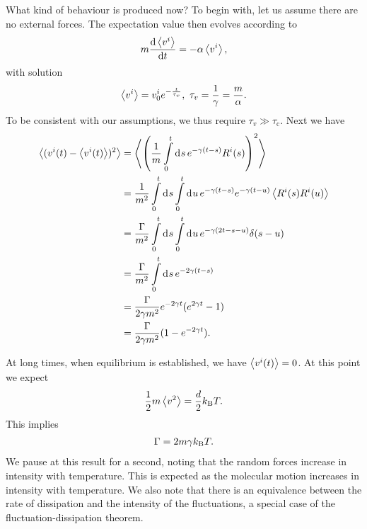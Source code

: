 What kind of behaviour is produced now? To begin with, let us assume there are no external forces. The expectation value then evolves according to
\begin{align*}
	m\dv{\expval{v^{i}}}{t} =  -\alpha\expval{v^{i}},
\end{align*}
with solution
\begin{align*}
	\expval{v^{i}} = v^{i}_{0}e^{-\frac{t}{\tau_{v}}},\ \tau_{v} = \frac{1}{\gamma} = \frac{m}{\alpha}.
\end{align*}
To be consistent with our assumptions, we thus require $\tau_{v} \gg \tau_{\text{c}}$. Next we have
\begin{align*}
	\expval{(v^{i}(t) - \expval{v^{i}(t)})^{2}} &= \expval{\left(\frac{1}{m}\int\limits_{0}^{t}\dd[]{s}e^{-\gamma(t - s)}R^{i}(s)\right)^{2}} \\
	                                            &= \frac{1}{m^{2}}\int\limits_{0}^{t}\dd[]{s}\int\limits_{0}^{t}\dd[]{u}e^{-\gamma(t - s)}e^{-\gamma(t - u)}\expval{R^{i}(s)R^{i}(u)} \\
	                                            &= \frac{\Gamma}{m^{2}}\int\limits_{0}^{t}\dd[]{s}\int\limits_{0}^{t}\dd[]{u}e^{-\gamma(2t - s - u)}\delta(s - u) \\
	                                            &= \frac{\Gamma}{m^{2}}\int\limits_{0}^{t}\dd[]{s}e^{-2\gamma(t - s)} \\
	                                            &= \frac{\Gamma}{2\gamma m^{2}}e^{-2\gamma t}(e^{2\gamma t} - 1) \\
	                                            &= \frac{\Gamma}{2\gamma m^{2}}(1 - e^{-2\gamma t}).
\end{align*}

At long times, when equilibrium is established, we have $\expval{v^{i}(t)} = 0$. At this point we expect
\begin{align*}
	\frac{1}{2}m\expval{v^{2}} = \frac{d}{2}k_{\text{B}} T.
\end{align*}
This implies
\begin{align*}
	\Gamma = 2m\gamma k_{\text{B}} T.
\end{align*}
We pause at this result for a second, noting that the random forces increase in intensity with temperature. This is expected as the molecular motion increases in intensity with temperature. We also note that there is an equivalence between the rate of dissipation and the intensity of the fluctuations, a special case of the fluctuation-dissipation theorem.

